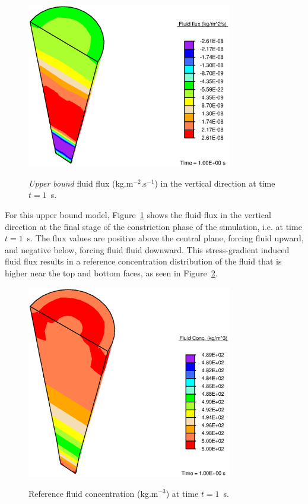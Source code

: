 \begin{figure}[!hpt]
  \centering
      {\includegraphics[width=0.8\textwidth]{images/examples/lagrangian/constriction/upper-bound-flux}}
      \caption{{\em Upper bound} fluid flux (kg.m$^{-2}$.s$^{-1}$) in
        the vertical direction at time $t=1$~s.}
      \label{eg2flux}
\end{figure}

\noindent For this upper bound model, Figure~\ref{eg2flux} shows the fluid flux in
the vertical direction at the final stage of the constriction phase of
the simulation, i.e. at time $t=1$~s. The flux values are positive
above the central plane, forcing fluid upward, and negative below,
forcing fluid fluid downward. This stress-gradient induced fluid flux
results in a reference concentration distribution of the fluid that is
higher near the top and bottom faces, as seen in Figure~\ref{eg2conc}.

\begin{figure}[!hpt]
  \centering
      {\includegraphics[width=0.8\textwidth]{images/examples/lagrangian/constriction/fluid-concentration}}
      \caption{Reference fluid concentration (kg.m$^{-3}$) at time
      $t=1$~s.}
      \label{eg2conc}
\end{figure}

